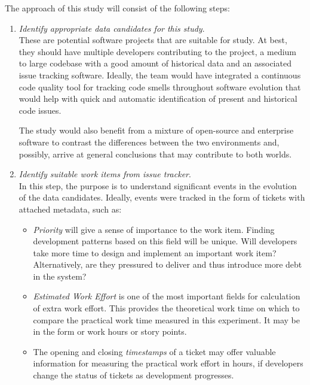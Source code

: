 The approach of this study will consist of the following steps:
\begin{enumerate}
	\item \textit{Identify appropriate data candidates for this study}.\\
	      These are potential software projects that are suitable for study.
	      At best, they should have multiple developers contributing to the
	      project, a medium to large codebase with a good amount of historical
	      data and an associated issue tracking software. Ideally, the team
	      would have integrated a continuous code quality tool for tracking
	      code smells throughout software evolution that would help with quick
	      and automatic identification of present and historical code issues.

	      The study would also benefit from a mixture of open-source and
	      enterprise software to contrast the differences between the two
	      environments and, possibly, arrive at general conclusions that may
	      contribute to both worlds.

	\item \textit{Identify suitable work items from issue tracker}.\\
	      In this step, the purpose is to understand significant events in the
	      evolution of the data candidates. Ideally, events were tracked in the
	      form of tickets with attached metadata, such as:
	      \begin{itemize}
		      \item \textit{Priority} will give a sense of importance to the
		            work item. Finding development patterns based on this
		            field will be unique. Will developers take more time to
		            design and implement an important work item?
		            Alternatively, are they pressured to deliver and thus
		            introduce more debt in the system?
		      \item \textit{Estimated Work Effort} is one of the most
		            important fields for calculation of extra work effort.
		            This provides the theoretical work time on which to
		            compare the practical work time measured in this
		            experiment. It may be in the form or work hours or story
		            points.
		      \item The opening and closing \textit{timestamps} of a ticket
		            may offer valuable information for measuring the
		            practical work effort in hours, if developers change the
		            status of tickets as development progresses.
	      \end{itemize}


\end{enumerate}
